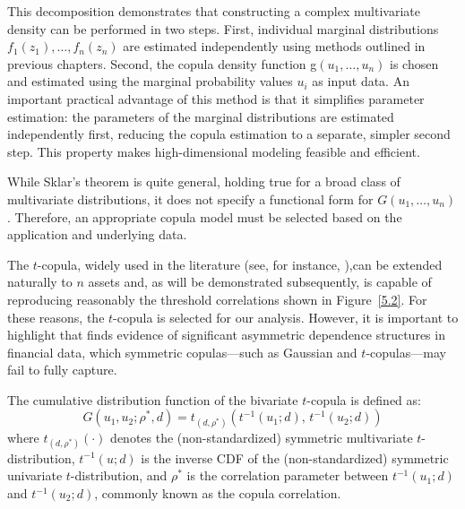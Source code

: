 This decomposition demonstrates that constructing a complex multivariate density can be performed in two steps. First, individual marginal distributions $f_1(z_1), \ldots, f_n(z_n)$ are estimated independently using methods outlined in previous chapters. Second, the copula density function g$(u_1, \ldots, u_n)$ is chosen and estimated using the marginal probability values $u_i$ as input data.
\newpage
An important practical advantage of this method is that it simplifies parameter estimation: the parameters of the marginal distributions are estimated independently first, reducing the copula estimation to a separate, simpler second step. This property makes high-dimensional modeling feasible and efficient.

While Sklar’s theorem is quite general, holding true for a broad class of multivariate distributions, it does not specify a functional form for $G(u_1, \ldots, u_n)$. Therefore, an appropriate copula model must be selected based on the application and underlying data.

The $t$-copula, widely used in the literature (see, for instance, ),can be extended naturally to $n$ assets and, as will be demonstrated subsequently, is capable of reproducing reasonably the threshold correlations shown in Figure~\ref{5.2}. For these reasons, the $t$-copula is selected for our analysis. However, it is important to highlight that  finds evidence of significant asymmetric dependence structures in financial data, which symmetric copulas—such as Gaussian and $t$-copulas—may fail to fully capture.

The cumulative distribution function of the bivariate $t$-copula is defined as:
\begin{equation}
G(u_1, u_2; \rho^*, d) = t_{(d, \rho^*)} \left( t^{-1}(u_1; d), \, t^{-1}(u_2; d) \right)
\label{eq:5.2}
\end{equation}
where $t_{(d,\rho^*)}(\cdot)$ denotes the (non-standardized) symmetric multivariate $t$-distribution, $t^{-1}(u; d)$ is the inverse CDF of the (non-standardized) symmetric univariate $t$-distribution, and $\rho^*$ is the correlation parameter between $t^{-1}(u_1; d)$ and $t^{-1}(u_2; d)$, commonly known as the copula correlation.

